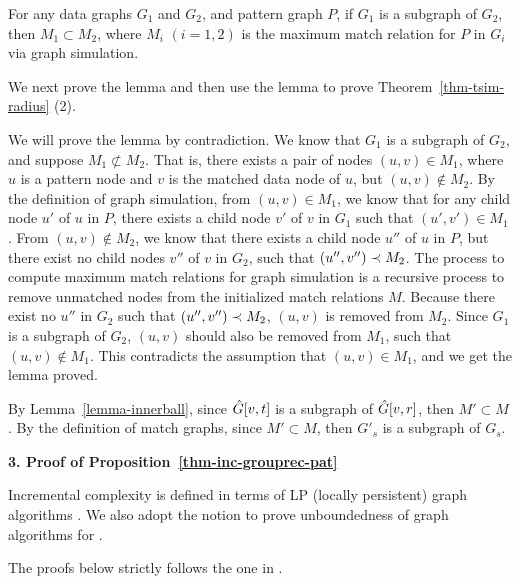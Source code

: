 \vspace{-2.7ex}
\begin{lemma}
	\label{lemma-innerball}
	For any data graphs $G_1$ and $G_2$, and pattern graph $P$, if $G_1$ is a subgraph of $G_2$,
	then $M_1 \subset M_2$, where $M_i$ $(i=1,2)$ is the maximum match relation for $P$ in $G_i$ via graph simulation. 
\end{lemma}
\vspace{-2.5ex}

We next prove the lemma and then use the lemma to prove Theorem~\ref{thm-tsim-radius} (2).

\vspace{-1.3ex}
 We will prove the lemma by contradiction. 
We know that $G_1$ is a subgraph of $G_2$, and suppose $M_1 \not\subset M_2$.
That is, there exists a pair of nodes $(u, v) \in M_1$, where $u$ is a pattern node 
and $v$ is the matched data node of $u$, but $(u, v) \not\in M_2$.
By the definition of graph simulation, from $(u, v) \in M_1$, we know that for any child node $u'$ of $u$ in $P$,
there exists a child node $v'$ of $v$ in $G_1$ such that $(u', v') \in M_1$.
From $(u, v) \not\in M_2$, we know that there exists a child node $u''$ of $u$ in $P$, 
but there exist no child nodes $v''$ of $v$ in $G_2$, such that $(u'', v'') \prec M_2$.
The process to compute maximum match relations for graph simulation is a recursive process to 
remove unmatched nodes from the initialized match relations $M$.
Because there exist no $u''$ in $G_2$ such that $(u'', v'') \prec M_2$, $(u, v)$ is removed from $M_2$.
Since $G_1$ is a subgraph of $G_2$, $(u, v)$ should also be removed from $M_1$, 
such that $(u, v) \not\in M_1$.
This contradicts the assumption that $(u, v) \in M_1$, and we get the lemma proved.
\eop

\vspace{-1.5ex}
By Lemma~\ref{lemma-innerball}, since $\hat{G}{[v, t]}$ is a subgraph of $\hat{G}{[v, r]}$, then $M' \subset M$.
By the definition of match graphs, since $M' \subset M$, then $G'_s$ is a subgraph of $G_s$.


\noindent
{\textbf{3. Proof of Proposition~\ref{thm-inc-grouprec-pat}}}

Incremental complexity is defined in terms of LP (locally persistent) graph algorithms \cite{Reps96}.
We also adopt the notion to prove unboundedness of graph algorithms for \dynteamF.

\vspace{-1.5ex}
The proofs below strictly follows the one in \cite{Reps96}.

